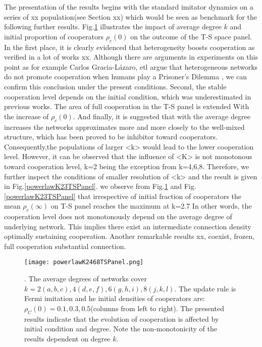\documentclass[preprint,12pt,3p]{elsarticle}
\begin{document}
    The presentation of the results begins with the standard imitator dynamics
on a series of xx population(see Section xx) which would be seen as benchmark for the following further results.
Fig.\ref{powerlawK2468TSPanel} illustrates the impact of average degree $k$ and initial proportion of cooperators
 $\rho_{c}(0)$ on the outcome of the T-S space panel.
In the first place, it is clearly evidenced that heterogeneity boosts cooperation as verified in a lot of works xx.
Although there are arguments in experiments on this point as for example Carlos Gracia-Lázaro, etl argue that heterogeneous networks do not promote cooperation when humans play a Prisoner’s Dilemma
\cite{Gracia-LázaroFerrer-18206}
, we can confirm this conclusion under the present conditions.
Second, the stable cooperation level depends on the initial condition, which was underestimated in previous works.
The area of full cooperation in the T-S panel is extended With the increase of $\rho_{c}(0)$.
And finally, it is suggested that with the average degree increases the networks approximates more and more closely
to the well-mixed structure, which has been proved to be inhibitor toward cooperators.
Consequently,the populations of larger <k> would lead to the lower cooperation level.
However, it can be observed that the influence of <K> is not monotonous toward cooperation level,
k=2 being the exception from k=4,6,8.
Therefore, we further inspect the conditions of smaller resolution of <k> and the result is given
 in Fig.\ref{powerlawK23TSPanel}.
we observe from Fig.\ref{powerlawK2468TSPanel} and Fig.\ref{powerlawK23TSPanel}
that irrespective of initial fraction of cooperators the mean $\rho_{c}(\infty)$ on T-S panel reaches the maximum
at k=2.7
In other words, the cooperation level does not monotonously depend on the average degree of underlying network.
This implies there exist an intermediate connection density optimally sustaining cooperation.
Another remarkable results xx, coexist, frozen, full cooperation
substantial connection.

\begin{figure}[htbp]
\centering
\texttt{[image: powerlawK2468TSPanel.png]}

\caption{\cooplevel.
The average degrees of networks cover $k=2(a,b,c),4(d,e,f),6(g,h,i),8(j,k,l)$.
The update rule is Fermi imitation and he initial densities of cooperators are:
$\rho_{C}(0)=0.1,0.3,0.5$(columns from left to right).
The presented results indicate that the evolution of cooperation is affected by initial condition and degree.
Note the non-monotonicity of the results dependent on degree $k$.}
\label{powerlawK2468TSPanel}
\end{figure}
\end{document}
